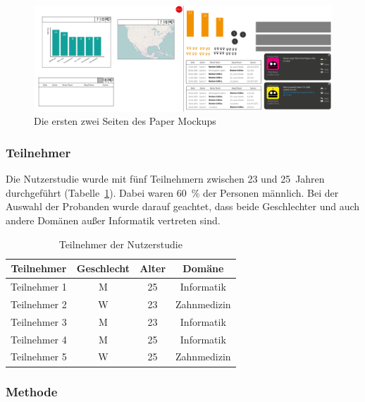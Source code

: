 \documentclass[
	headsepline,
	footsepline,
	fontsize=12pt,
	bibliography=totoc
]{scrbook}
\begin{document}
\begin{figure}[htbp]
   \centering
   \includegraphics[width=\textwidth]{images/konzeption-paper-mockup.png}
   \caption{Die ersten zwei Seiten des Paper Mockups}
   \label{figure:paper-mockup}
\end{figure}

\subsubsection{Teilnehmer}

Die Nutzerstudie wurde mit fünf Teilnehmern zwischen 23 und 25~Jahren durchgeführt (Tabelle~\ref{table:mockup:teilnehmer}). Dabei waren 60~\% der Personen männlich. Bei der Auswahl der Probanden wurde darauf geachtet, dass beide Geschlechter und auch andere Domänen außer Informatik vertreten sind.

\begin{table}[htbp]
	\centering
    \begin{tabular}{c|c|c|c}
    Teilnehmer   & Geschlecht & Alter & Domäne      \\
    \hline
    Teilnehmer 1 & M          & 25    & Informatik  \\ %
    Teilnehmer 2 & W          & 23    & Zahnmedizin \\ %
    Teilnehmer 3 & M          & 23    & Informatik  \\ %
    Teilnehmer 4 & M          & 25    & Informatik  \\ %
    Teilnehmer 5 & W          & 25    & Zahnmedizin \\ %
    \end{tabular}
    \caption{Teilnehmer der Nutzerstudie}
    \label{table:mockup:teilnehmer}
\end{table}

\subsubsection{Methode}

\end{document}

